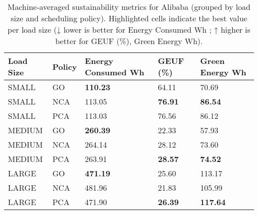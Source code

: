 \newcommand{\highlightcell}[1]{\textbf{#1}}

\begin{table}[h!tbp]
\centering
\caption{Machine-averaged sustainability metrics for Alibaba (grouped by load size and scheduling policy). Highlighted cells indicate the best value per load size (↓ lower is better for Energy Consumed Wh ; ↑ higher is better for GEUF (\%), Green Energy Wh).}
\label{tab:alibaba_results_summary}
\begin{tabular}{|m{1.8cm}|m{1.5cm}|m{2.0cm}|m{2.0cm}|m{2.0cm}|}
\toprule
Load Size & Policy & Energy Consumed Wh & GEUF (\%) & Green Energy Wh \\
\midrule
SMALL & GO & \highlightcell{110.23} & 64.11 & 70.69 \\
SMALL & NCA & 113.05 & \highlightcell{76.91} & \highlightcell{86.54} \\
SMALL & PCA & 113.03 & 76.56 & 86.12 \\
\midrule
MEDIUM & GO & \highlightcell{260.39} & 22.33 & 57.93 \\
MEDIUM & NCA & 264.14 & 28.12 & 73.60 \\
MEDIUM & PCA & 263.91 & \highlightcell{28.57} & \highlightcell{74.52} \\
\midrule
LARGE & GO & \highlightcell{471.19} & 25.60 & 113.17 \\
LARGE & NCA & 481.96 & 21.83 & 105.99 \\
LARGE & PCA & 471.90 & \highlightcell{26.39} & \highlightcell{117.64} \\
\bottomrule
\end{tabular}
\end{table}

